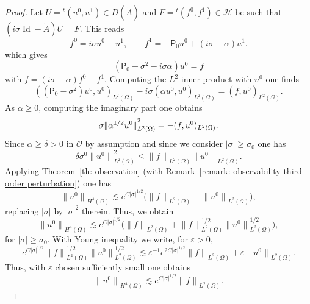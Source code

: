 \documentclass[10pt]{amsart}
\theoremstyle{plain}
\theoremstyle{definition}
\newcommand{\suff}{sufficiently\xspace}
\let\eps\varepsilon
\let \Im \relax
\DeclareMathOperator{\Im}{Im}
\newcommand{\inp}[2]{(#1, #2)}
\renewcommand{\H}{{\mathcal H}}
\newcommand{\scrO}{\mathscr O}
\newcommand{\transp}{\ensuremath{\phantom{}^{t}}}
\newcommand{\Norm}[2]{{\| #1 \|}_{#2}}
\newcommand{\Pell}{\mathsf P_0}
\DeclareMathOperator{\id}{Id}
\begin{document}
\begin{proof}
Let $U= \transp (u^0,u^1)\in D(\dot A)$ and $F= \transp (f^0,f^1)\in \dot{\H}$ be such that
$(i\sigma\id-\dot{A}) U=F$. This reads
\begin{equation*}
f^0=i\sigma u^0+u^1,
\qquad
f^1=-\Pell u^0+(i\sigma-\alpha)u^1.
\end{equation*}
which gives
\begin{equation*}
(\Pell -\sigma^2-i\sigma\alpha)u^0=f
\end{equation*}
with $f=(i\sigma-\alpha)f^0-f^1$. Computing the $L^2$-inner product
with $u^0$ one finds
\begin{equation*}
\inp{(\Pell - \sigma^2) u^0}{u^0}_{L^2(\Omega)}
- i \sigma \inp{\alpha u^0}{u^0}_{L^2(\Omega)}
= \inp{f}{u^0}_{L^2(\Omega)}.
\end{equation*}
As $\alpha \geq 0$, computing the imaginary part one obtains
\begin{equation*}
\sigma \Norm{\alpha^{1/2} u^0}{L^2(\Omega)}^2
=-\Im \inp{f}{u^0}_{L^2(\Omega)}.
\end{equation*}
Since $\alpha\geq \delta>0$ in $\scrO$ by assumption and since we consider
$|\sigma| \geq \sigma_0$ one has
\begin{equation*}
\delta \sigma^0 \Norm{u^0}{L^2(\scrO)}^2
\leq \Norm{f}{L^2(\Omega)}
\Norm{u^0}{L^2(\Omega)}.
\end{equation*}
Applying Theorem~\ref{th: observation} (with Remark~\ref{remark: observability third-order perturbation}) one has
\begin{equation*}
\Norm{u^0}{H^4(\Omega)}
\lesssim e^{C|\sigma|^{1/2}}
\big(\Norm{f}{L^2(\Omega)}+\Norm{u^0}{L^2(\scrO)}
\big),
\end{equation*}
replacing $|\sigma|$ by $|\sigma|^2$ therein.
Thus, we obtain
\begin{equation*}
\Norm{u^0}{H^4(\Omega)}
\lesssim e^{C|\sigma|^{1/2}}
\big(\Norm{f}{L^2(\Omega)}+\Norm{f}{L^2(\Omega)}^{1/2}
\Norm{u^0}{L^2(\Omega)}^{1/2}
\big),
\end{equation*}
for $|\sigma| \geq \sigma_0$.
With Young inequality we write, for $\eps>0$,
\begin{equation*}
e^{C|\sigma|^{1/2}}\Norm{f}{L^2(\Omega)}^{1/2}
\Norm{u^0}{L^2(\Omega)}^{1/2}
\lesssim \eps^{-1}e^{2C|\sigma|^{1/2}}\Norm{f}{L^2(\Omega)}
+ \eps \Norm{u^0}{L^2(\Omega)}.
\end{equation*}
Thus, with $\eps$ chosen \suff small one obtains
\begin{equation*}
\Norm{u^0}{H^4(\Omega)}
\lesssim e^{C|\sigma|^{1/2}}
\Norm{f}{L^2(\Omega)}.
\end{equation*}

\end{proof}
\end{document}
